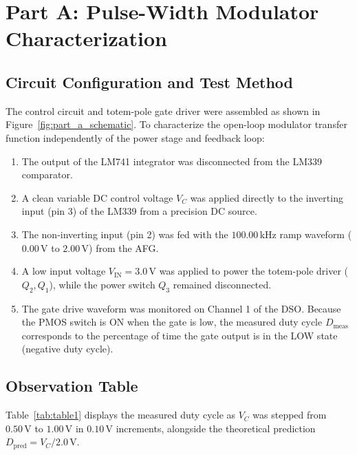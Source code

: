\documentclass[12pt,a4paper]{article}
\newcommand{\Vin}{V_{\mathrm{IN}}}
\newcommand{\Vc}{V_C}
\begin{document}
\section{Part A: Pulse-Width Modulator Characterization}
\label{sec:part_a}

\subsection{Circuit Configuration and Test Method}
The control circuit and totem-pole gate driver were assembled as shown in Figure~\ref{fig:part_a_schematic}. To characterize the open-loop modulator transfer function independently of the power stage and feedback loop:
\begin{enumerate}[leftmargin=1.5em]
    \item The output of the LM741 integrator was disconnected from the LM339 comparator.
    \item A clean variable DC control voltage $\Vc$ was applied directly to the inverting input (pin 3) of the LM339 from a precision DC source.
    \item The non-inverting input (pin 2) was fed with the $100.00\,\mathrm{kHz}$ ramp waveform ($0.00\,\mathrm{V}$ to $2.00\,\mathrm{V}$) from the AFG.
    \item A low input voltage $\Vin = 3.0\,\mathrm{V}$ was applied to power the totem-pole driver ($Q_2, Q_1$), while the power switch $Q_3$ remained disconnected.
    \item The gate drive waveform was monitored on Channel 1 of the DSO. Because the PMOS switch is ON when the gate is low, the measured duty cycle $D_{\mathrm{meas}}$ corresponds to the percentage of time the gate output is in the LOW state (negative duty cycle).
\end{enumerate}



\subsection{Observation Table}
Table~\ref{tab:table1} displays the measured duty cycle as $\Vc$ was stepped from $0.50\,\mathrm{V}$ to $1.00\,\mathrm{V}$ in $0.10\,\mathrm{V}$ increments, alongside the theoretical prediction $D_{\mathrm{pred}} = \Vc / 2.0\,\mathrm{V}$.
\end{document}
